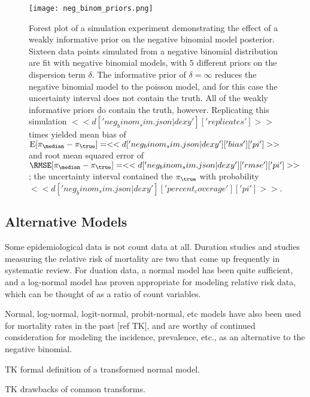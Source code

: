 \begin{figure}
\begin{center}
\texttt{[image: neg\_binom\_priors.png]}
\end{center}
\caption{Forest plot of a simulation experiment demonstrating the
  effect of a weakly informative prior on the negative binomial model
  posterior.  Sixteen data points simulated from a negative binomial
  distribution are fit with negative binomial models, with $5$
  different priors on the dispersion term $\delta$.  The informative
  prior of $\delta = \infty$ reduces the negative binomial model to
  the poisson model, and for this case the uncertainty interval does
  not contain the truth.  All of the weakly informative priors do
  contain the truth, however.  Replicating this simulation
  $<<d['neg_binom_sim.json|dexy']['replicates']>>$ times yielded mean
  bias of
  $\E[\pi_{\median}-\pi_{\true}]=<<d['neg_binom_sim.json|dexy']['bias']['pi']>>$
  and root mean squared error of
  $\RMSE[\pi_{\median}-\pi_{\true}]=<<d['neg_binom_sim.json|dexy']['rmse']['pi']>>$;
  the uncertainty interval contained the $\pi_{\true}$ with probability
  $<<d['neg_binom_sim.json|dexy']['percent_coverage']['pi']>>$.}
\label{fig:theory-rate_model-neg_binom_priors}
\end{figure}

\subsection{Alternative Models}
Some epidemiological data is not count data at all.  Duration studies
and studies measuring the relative risk of mortality are two that come
up frequently in systematic review.  For duation data, a normal model
has been quite sufficient, and a log-normal model has proven
appropriate for modeling relative risk data, which can be thought of
as a ratio of count variables.

Normal, log-normal, logit-normal, probit-normal, etc models have also
been used for mortality rates in the past [ref TK], and are worthy of
continued consideration for modeling the incidence, prevalence, etc.,
as an alternative to the negative binomial.

TK formal definition of a transformed normal model.

TK drawbacks of common transforms.

